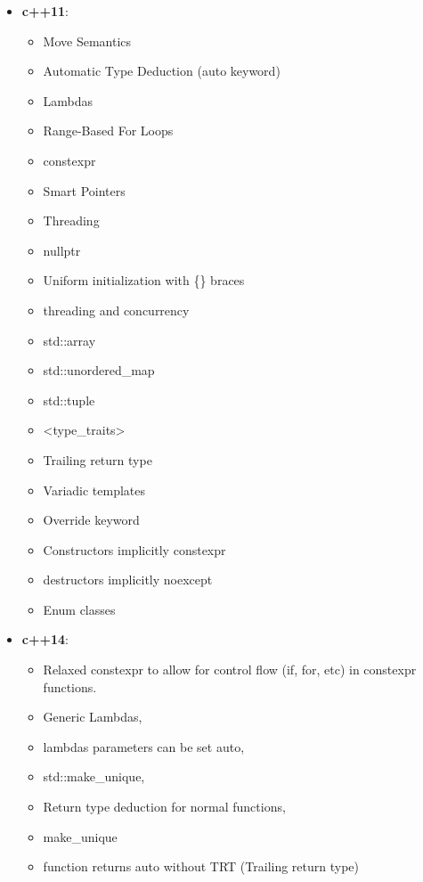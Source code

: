 \documentclass{report}
\begin{document}
\pagebreak 
{}
\begin{itemize}
    \item \textbf{c++11}: 
        \begin{itemize}
            \item Move Semantics
            \item Automatic Type Deduction (auto keyword)
            \item Lambdas
            \item Range-Based For Loops
            \item constexpr
            \item Smart Pointers
            \item Threading
            \item nullptr
            \item Uniform initialization with \{\} braces
            \item threading and concurrency
            \item std::array
            \item std::unordered\_map
            \item std::tuple
            \item <type\_traits>
            \item Trailing return type
            \item Variadic templates
            \item Override keyword
            \item Constructors implicitly constexpr
            \item destructors implicitly noexcept
            \item Enum classes
        \end{itemize}
    \item \textbf{c++14}: 
        \begin{itemize}
            \item Relaxed constexpr to allow for control flow (if, for, etc) in constexpr functions. 
            \item Generic Lambdas,
            \item lambdas parameters can be set auto,
            \item std::make\_unique,
            \item Return type deduction for normal functions,
            \item make\_unique
            \item function returns auto without TRT (Trailing return type)

\end{itemize}
\end{itemize}
\end{document}
